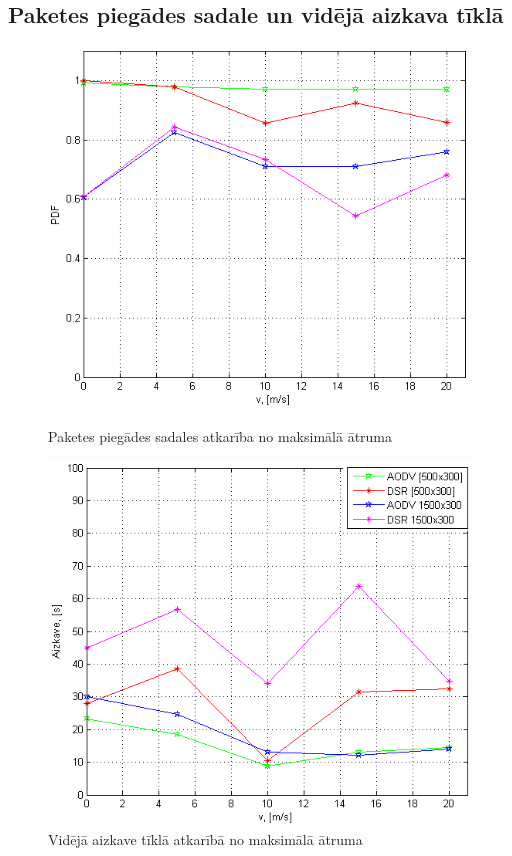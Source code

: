 \subsection{Paketes piegādes sadale un vidējā aizkava tīklā}
\begin{figure}[htb!]
\begin{minipage}[t]{0.47\linewidth}
\centering
\includegraphics[scale=0.55]{./graph/vPDF.png}
\caption{Paketes piegādes sadales atkarība no maksimālā ātruma}
\label{fig:pdfspeed}
\end{minipage}%
\hspace{0.2cm}
\begin{minipage}[t]{0.47\linewidth}
\centering
\includegraphics[scale=0.55]{./graph/vDelay.png}
\caption{Vidējā aizkave tīklā atkarībā no maksimālā ātruma}
\label{fig:avgDspeed}
\end{minipage}
\end{figure}
